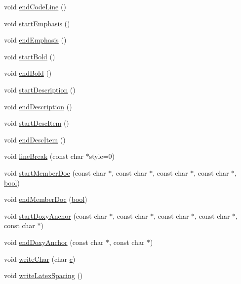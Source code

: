 \begin{DoxyCompactItemize}
\item 
void \hyperlink{class_latex_generator_a87b0106936769e1226310df32ec5e1a6}{end\+Code\+Line} ()
\item 
void \hyperlink{class_latex_generator_a247441f3922c912966d8193f578f5c74}{start\+Emphasis} ()
\item 
void \hyperlink{class_latex_generator_a5837f5169fd6b05b088a4d9182756711}{end\+Emphasis} ()
\item 
void \hyperlink{class_latex_generator_a48859c667b43515483f4adb04f46cf0e}{start\+Bold} ()
\item 
void \hyperlink{class_latex_generator_ae2336bd8bc8ca0802fb94ff6953e7779}{end\+Bold} ()
\item 
void \hyperlink{class_latex_generator_a32a518fb74711bc0e791c03e95c666cb}{start\+Description} ()
\item 
void \hyperlink{class_latex_generator_a3da64ef2d6cfe58facd7a35ad736ea83}{end\+Description} ()
\item 
void \hyperlink{class_latex_generator_a92603047f2bff0fef3c2bd5ed1be73d9}{start\+Desc\+Item} ()
\item 
void \hyperlink{class_latex_generator_aa675b530ccd61f9c4784efc2abcedbaa}{end\+Desc\+Item} ()
\item 
void \hyperlink{class_latex_generator_a91b269c8334ab9dffaf5d07d4c34ae69}{line\+Break} (const char $\ast$style=0)
\item 
void \hyperlink{class_latex_generator_a3dda78cce756957b3aa1dc249798acea}{start\+Member\+Doc} (const char $\ast$, const char $\ast$, const char $\ast$, const char $\ast$, \hyperlink{qglobal_8h_a1062901a7428fdd9c7f180f5e01ea056}{bool})
\item 
void \hyperlink{class_latex_generator_a51b9aabafad0c3536c40033e4a200e58}{end\+Member\+Doc} (\hyperlink{qglobal_8h_a1062901a7428fdd9c7f180f5e01ea056}{bool})
\item 
void \hyperlink{class_latex_generator_a9150e3ed0cc728e11d3d73f7d1965a81}{start\+Doxy\+Anchor} (const char $\ast$, const char $\ast$, const char $\ast$, const char $\ast$, const char $\ast$)
\item 
void \hyperlink{class_latex_generator_a559ff209839486737e1fe0bea3badd1f}{end\+Doxy\+Anchor} (const char $\ast$, const char $\ast$)
\item 
void \hyperlink{class_latex_generator_a910e0329c0a8c8b54685d2335d22f690}{write\+Char} (char \hyperlink{060__command__switch_8tcl_ab14f56bc3bd7680490ece4ad7815465f}{c})
\item 
void \hyperlink{class_latex_generator_a9ca2b0c10ac902436350642079fbd56b}{write\+Latex\+Spacing} ()

\end{DoxyCompactItemize}

